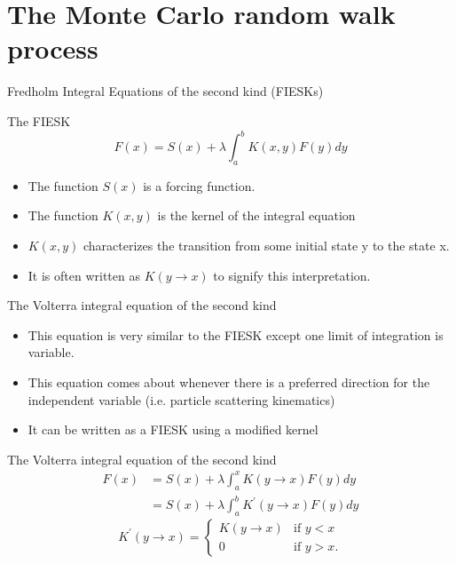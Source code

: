 \documentclass{beamer}
\begin{document}
\section{The Monte Carlo random walk process}
\begin{frame}{Fredholm Integral Equations of the second kind (FIESKs)}

  \begin{beamerboxesrounded}{The FIESK}
    \begin{equation*}
      F(x) = S(x) + \lambda \int_a^b K(x,y) F(y)dy
      \label{eq:fredholm_int_eqn}
    \end{equation*}
  \end{beamerboxesrounded}
  
  \begin{itemize}
    \item The function $S(x)$ is a forcing function.
    \item The function $K(x,y)$ is the kernel of the integral equation
    \item $K(x,y)$ characterizes the transition from some initial state y to
      the state x.
    \item It is often written as $K(y \to x)$ to signify this interpretation.
  \end{itemize}
  
\end{frame}

\begin{frame}{The Volterra integral equation of the second kind}
  
  \begin{itemize}
    \item This equation is very similar to the FIESK except one limit of 
      integration is variable.
    \item This equation comes about whenever there is a preferred direction for 
      the independent variable (i.e. particle scattering kinematics)
    \item It can be written as a FIESK using a modified kernel
  \end{itemize}

  \begin{beamerboxesrounded}{The Volterra integral equation of the second kind}
    \begin{align}
      F(x) & = S(x) + \lambda \int_a^x K(y \to x) F(y) dy
      \nonumber \\
      & = S(x) + \lambda \int_a^b K^{'}(y \to x) F(y) dy \nonumber
    \end{align}
    \begin{equation*}
      K^{'}(y \to x) = 
      \begin{cases}
        K(y \to x) & \text{if }y < x \\
        0 & \text{if }y > x.
      \end{cases}
    \end{equation*}
  \end{beamerboxesrounded}

\end{frame}
\end{document}
